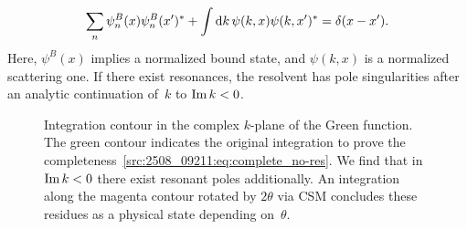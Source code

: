 \begin{align}
    \sum_n\psi_n^B(x)\psi_n^B(x')^* + \int \mathrm{d} k\, \psi(k,x)\psi(k,x')^* = \delta(x-x') .
    \label{src:2508_09211:eq:complete_no-res}
\end{align}
Here, $\psi^B(x)$ implies a normalized bound state, and $\psi(k,x)$ is a normalized scattering one. If there exist resonances, the resolvent has pole singularities after an analytic continuation of~$k$ to $\operatorname{Im} k<0$.
\begin{figure}[t]
    \centering
    \caption{Integration contour in the complex $k$-plane of the Green function. The green contour indicates the original integration to prove the completeness~\eqref{src:2508_09211:eq:complete_no-res}. We find that in $\operatorname{Im} k<0$ there exist resonant poles additionally. An integration along the magenta contour rotated by $2\theta$ via CSM concludes these residues as a physical state depending on~$\theta$.}
    \label{src:2508_09211:fig:complete_contour}
\end{figure}
